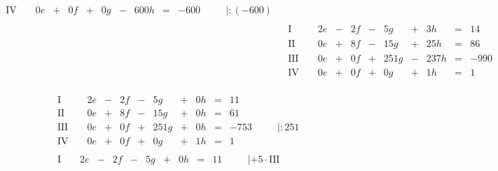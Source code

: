 \begin{exercise}
\begin{minipage}[t]{0.49\linewidth}
\begin{align*}
\begin{array}{r|rrrrrrrrrrrl}
         \text{IV}{\,} & {\,} & \num{0}e & + & \num{0}f & + &   \num{0}g & - & \num{600}h & = & -\num{600} & {\quad} & |:\left(-\num{600}\right)
        \end{array}
        \\[1ex]&
        \begin{array}{r|rrrrrrrrrrrl}
          \text{I}{\,} & {\,} & \num{2}e & - & \num{2}f & - &   \num{5}g & + &   \num{3}h & = &   \num{14} & {\quad} & |-\num{3}\cdot\text{IV}   \\
         \text{II}{\,} & {\,} & \num{0}e & + & \num{8}f & - &  \num{15}g & + &  \num{25}h & = &   \num{86} & {\quad} & |-\num{25}\cdot\text{IV}  \\
        \text{III}{\,} & {\,} & \num{0}e & + & \num{0}f & + & \num{251}g & - & \num{237}h & = & -\num{990} & {\quad} & |+\num{237}\cdot\text{IV} \\
         \text{IV}{\,} & {\,} & \num{0}e & + & \num{0}f & + &   \num{0}g & + &   \num{1}h & = &    \num{1} & {\quad} &
        \end{array}
        \end{align*}
      \end{minipage}%
      \hfill
      \begin{minipage}[t]{0.49\linewidth}
        \vspace*{-\abovedisplayskip}
        \begin{align*}
        &
        \begin{array}{r|rrrrrrrrrrrl}
          \text{I}{\,} & {\,} & \num{2}e & - & \num{2}f & - &   \num{5}g & + & \num{0}h & = &   \num{11} & {\quad} &             \\
         \text{II}{\,} & {\,} & \num{0}e & + & \num{8}f & - &  \num{15}g & + & \num{0}h & = &   \num{61} & {\quad} &             \\
        \text{III}{\,} & {\,} & \num{0}e & + & \num{0}f & + & \num{251}g & + & \num{0}h & = & -\num{753} & {\quad} & |:\num{251} \\
         \text{IV}{\,} & {\,} & \num{0}e & + & \num{0}f & + &   \num{0}g & + & \num{1}h & = &    \num{1} & {\quad} &
        \end{array}
        \\[1ex]&
        \begin{array}{r|rrrrrrrrrrrl}
          \text{I}{\,} & {\,} & \num{2}e & - & \num{2}f & - &  \num{5}g & + & \num{0}h & = & \num{11} & {\quad} & |+\num{5}\cdot\text{III}  \\

\end{array}
\end{align*}
\end{minipage}
\end{exercise}
